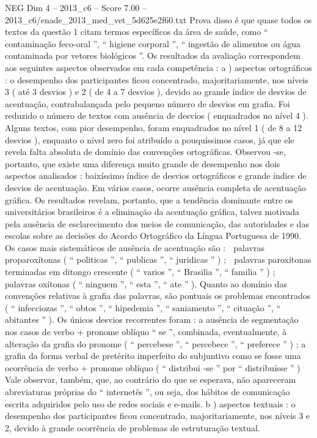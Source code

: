 \begin{textsample}{NEG Dim 4 – 2013\_c6 – Score 7.00 – 2013\_c6/enade\_2013\_med\_vet\_5d625e2f60.txt}
Prova disso é que quase todos os textos da questão 1 citam termos específicos da área de saúde, como “ contaminação feco-oral ”, “ higiene corporal ”, “ ingestão de alimentos ou água contaminada por vetores biológicos ”.
Os resultados da avaliação correspondem aos seguintes aspectos observados em cada competência : a ) aspectos ortográficos : o desempenho dos participantes ficou concentrado, majoritariamente, nos níveis 3 ( até 3 desvios ) e 2 ( de 4 a 7 desvios ), devido ao grande índice de desvios de acentuação, contrabalançada pelo pequeno número de desvios em grafia.
Foi reduzido o número de textos com ausência de desvios ( enquadrados no nível 4 ).
Alguns textos, com pior desempenho, foram enquadrados no nível 1 ( de 8 a 12 desvios ), enquanto o nível zero foi atribuído a pouquíssimos casos, já que ele revela falta absoluta de domínio das convenções ortográficas.
Observou -se, portanto, que existe uma diferença muito grande de desempenho nos dois aspectos analisados : baixíssimo índice de desvios ortográficos e grande índice de desvios de acentuação.
Em vários casos, ocorre ausência completa de acentuação gráfica.
Os resultados revelam, portanto, que a tendência dominante entre os universitários brasileiros é a eliminação da acentuação gráfica, talvez motivada pela ausência de esclarecimento dos meios de comunicação, das autoridades e das escolas sobre as decisões do Acordo Ortográfico da Língua Portuguesa de 1990.
Os casos mais sistemáticos de ausência de acentuação são :  palavras proparoxítonas ( “ politicas ”, “ publicas ”, “ juridicas ” ) ;  palavras paroxítonas terminadas em ditongo crescente ( “ varios ”, “ Brasilia ”, “ familia ” ) ;  palavras oxítonas ( “ ninguem ”, “ esta ”, “ ate ” ).
Quanto ao domínio das convenções relativas à grafia das palavras, são pontuais os problemas encontrados ( “ infecciozas ”, “ obtos ”, “ hipedemia ”, “ saniamento ”, “ cituação ”, “ abitantes ” ).
Os únicos desvios recorrentes foram : a ausência de segmentação nos casos de verbo + pronome oblíquo “ se ”, combinada, eventualmente, à alteração da grafia do pronome ( “ percebese ”, “ percebece ”, “ preferece ” ) ; a grafia da forma verbal de pretérito imperfeito do subjuntivo como se fosse uma ocorrência de verbo + pronome oblíquo ( “ distribui -se ” por “ distribuísse ” ) Vale observar, também, que, ao contrário do que se esperava, não apareceram abreviaturas próprias do “ internetês ”, ou seja, dos hábitos de comunicação escrita adquiridos pelo uso de redes sociais e e-mails. b ) aspectos textuais : o desempenho dos participantes ficou concentrado, majoritariamente, nos níveis 3 e 2, devido à grande ocorrência de problemas de estruturação textual.

\end{textsample}
